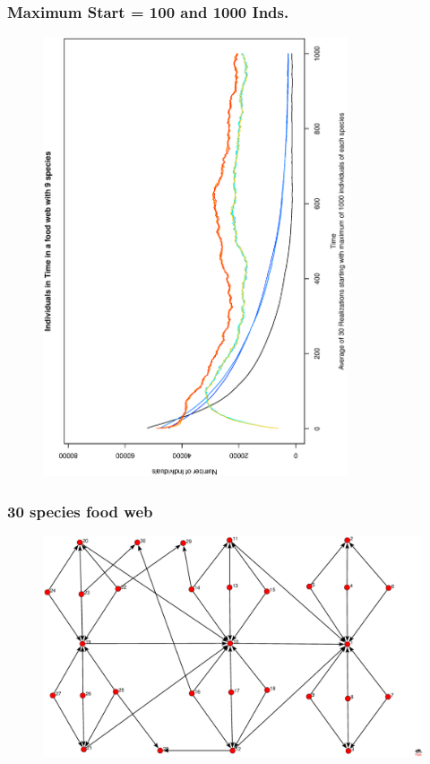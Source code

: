 \documentclass[xcolor=x11names,compress]{beamer}
\renewcommand{\(}{\begin{columns}}
\renewcommand{\)}{\end{columns}}
\newcommand{\<}[1]{\begin{column}{#1}}
\renewcommand{\>}{\end{column}}
\begin{document}

\begin{frame}
\frametitle{Maximum Start = 100 and 1000 Inds.}
\begin{figure}
\includegraphics[angle=270,width=0.8\textwidth]{./AverIndInTime_30Real_100_1000.eps}
\end{figure}
\end{frame}


\begin{frame}
\frametitle{30 species food web}
\begin{figure}
\includegraphics[width=1.0\textwidth]{./FoodWeb_30bloques9.eps}
\end{figure}
\end{frame}
\end{document}
